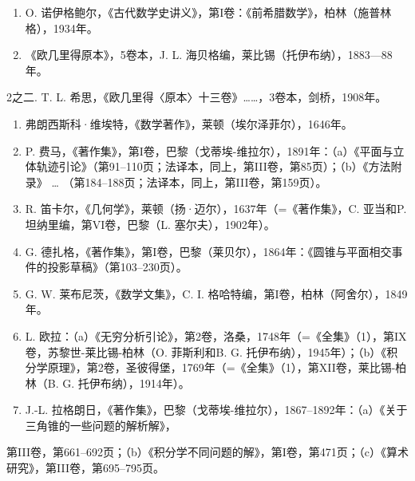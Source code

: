 
\begin{enumerate}
\def\labelenumi{\arabic{enumi}.}
\item
  O. 诺伊格鲍尔，《古代数学史讲义》，第I卷：《前希腊数学》，柏林（施普林格），1934年。
\item
  《欧几里得原本》，5卷本，J. L. 海贝格编，莱比锡（托伊布纳），1883—88年。
\end{enumerate}

2之二. T. L. 希思，《欧几里得〈原本〉十三卷》……，3卷本，剑桥，1908年。

\begin{enumerate}
\def\labelenumi{\arabic{enumi}.}
\setcounter{enumi}{2}
\item
  弗朗西斯科·维埃特，《数学著作》，莱顿（埃尔泽菲尔），1646年。
\item
  P. 费马，《著作集》，第I卷，巴黎（戈蒂埃-维拉尔），1891年：（a）《平面与立体轨迹引论》（第91--110页；法译本，同上，第III卷，第85页）；（b）《方法附录》 \ldots{} （第184--188页；法译本，同上，第III卷，第159页）。
\item
  R. 笛卡尔，《几何学》，莱顿（扬·迈尔），1637年（=《著作集》，C. 亚当和P. 坦纳里编，第VI卷，巴黎（L. 塞尔夫），1902年）。
\item
  G. 德扎格，《著作集》，第I卷，巴黎（莱贝尔），1864年：《圆锥与平面相交事件的投影草稿》（第103--230页）。
\item
  G. W. 莱布尼茨，《数学文集》，C. I. 格哈特编，第I卷，柏林（阿舍尔），1849年。
\item
  L. 欧拉：（a）《无穷分析引论》，第2卷，洛桑，1748年（=《全集》（1），第IX卷，苏黎世-莱比锡-柏林（O. 菲斯利和B. G. 托伊布纳），1945年）；（b）《积分学原理》，第2卷，圣彼得堡，1769年（=《全集》（1），第XII卷，莱比锡-柏林（B. G. 托伊布纳），1914年）。
\item
  J.-L. 拉格朗日，《著作集》，巴黎（戈蒂埃-维拉尔），1867--1892年：（a）《关于三角锥的一些问题的解析解》，
\end{enumerate}

第III卷，第661--692页；（b）《积分学不同问题的解》，第I卷，第471页；（c）《算术研究》，第III卷，第695--795页。

